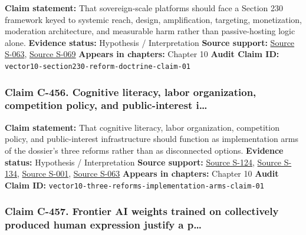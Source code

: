 \documentclass[
  american,
  11pt,
  letterpaper,
]{article}
\begin{document}
\textbf{Claim statement:} That sovereign-scale platforms should face a
Section 230 framework keyed to systemic reach, design, amplification,
targeting, monetization, moderation architecture, and measurable harm
rather than passive-hosting logic alone. \textbf{Evidence status:}
Hypothesis / Interpretation \textbf{Source support:}
\hyperref[source-s-063-a-look-behind-the-screens-examining-the-data-practices-of-social-media-and-video-streaming-services]{Source
S-063},
\hyperref[source-s-069-social-media-and-youth-mental-health-the-u-s-surgeon-general-s-advisory]{Source
S-069} \textbf{Appears in chapters:} Chapter 10 \textbf{Audit Claim ID:}
\texttt{vector10-section230-reform-doctrine-claim-01}

\subsubsection{Claim C-456. Cognitive literacy, labor organization,
competition policy, and public-interest
i\ldots{}}\label{claim-c-456-cognitive-literacy-labor-organization-competition-policy-and-public-interest-i}

\textbf{Claim statement:} That cognitive literacy, labor organization,
competition policy, and public-interest infrastructure should function
as implementation arms of the dossier's three reforms rather than as
disconnected options. \textbf{Evidence status:} Hypothesis /
Interpretation \textbf{Source support:}
\hyperref[source-s-124-artificial-intelligence-and-the-future-of-teaching-and-learning-insights-and-recommendations]{Source
S-124},
\hyperref[source-s-134-in-oxford-handbook-on-ai-governance-the-role-of-workers-in-ai-ethics-and-governance]{Source
S-134},
\hyperref[source-s-001-interactions-between-artificial-intelligence-and-digital-public-infrastructure-concepts-benefits-and-challenges]{Source
S-001},
\hyperref[source-s-063-a-look-behind-the-screens-examining-the-data-practices-of-social-media-and-video-streaming-services]{Source
S-063} \textbf{Appears in chapters:} Chapter 10 \textbf{Audit Claim ID:}
\texttt{vector10-three-reforms-implementation-arms-claim-01}

\subsubsection{Claim C-457. Frontier AI weights trained on collectively
produced human expression justify a
p\ldots{}}\label{claim-c-457-frontier-ai-weights-trained-on-collectively-produced-human-expression-justify-a-p}
\end{document}
